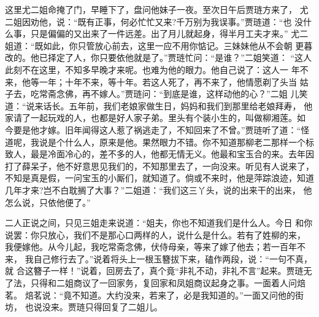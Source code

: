 这里尤二姐命掩了门，早睡下了，盘问他妹子一夜。至次日午后贾琏方来了，
尤二姐因劝他，说：“既有正事，何必忙忙又来?千万别为我误事。”贾琏道：“也
没什么事，只是偏偏的又出来了一件远差。出了月儿就起身，得半月工夫才来。”
尤二姐道：“既如此，你只管放心前去，这里一应不用你惦记。三妹妹他从不会朝
更暮改的。他已择定了人，你只要依他就是了。”贾琏忙问：“是谁？”二姐笑道：
“这人此刻不在这里，不知多早晚才来呢。也难为他的眼力。他自己说了：这人一
年不来，他等一年；十年不来，等十年。若这人死了，再不来了，他情愿剃了头当
姑子去，吃常斋念佛，再不嫁人。”贾琏问：“到底是谁，这样动他的心？”二姐
儿笑道：“说来话长。五年前，我们老娘家做生日，妈妈和我们到那里给老娘拜寿，
他家请了一起玩戏的人，也都是好人家子弟。里头有个装小生的，叫做柳湘莲。如
今要是他才嫁。旧年闻得这人惹了祸逃走了，不知回来了不曾。”贾琏听了道：“怪
道呢，我说是个什么人，原来是他。果然眼力不错。你不知道那柳老二那样一个标
致人，最是冷面冷心的，差不多的人，他都无情无义。他最和宝玉合的来。去年因
打了薛呆子，他不好意思见我们的，不知那里去了，一向没来。听见有人说来了，
不知是真是假，一问宝玉的小厮们，就知道了。倘或不来时，他是萍踪浪迹，知道
几年才来?岂不白耽搁了大事？”二姐道：“我们这三丫头，说的出来干的出来，
他怎么说，只依他便了。”

二人正说之间，只见三姐走来说道：“姐夫，你也不知道我们是什么人。今日
和你说罢：你只放心，我们不是那心口两样的人，说什么是什么。若有了姓柳的来，
我便嫁他。从今儿起，我吃常斋念佛，伏侍母亲，等来了嫁了他去；若一百年不来，
我自己修行去了。”说着将头上一根玉簪拔下来，磕作两段，说：“一句不真，就
合这簪子一样！”说着，回房去了，真个竟“非礼不动，非礼不言”起来。贾琏无
了法，只得和二姐商议了一回家务，复回家和凤姐商议起身之事。一面着人问焙茗。
焙茗说：“竟不知道。大约没来，若来了，必是我知道的。”一面又问他的街坊，
也说没来。贾琏只得回复了二姐儿。

